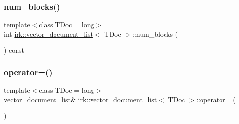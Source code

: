 \subsubsection{\texorpdfstring{num\+\_\+blocks()}{num\_blocks()}}
{\footnotesize\ttfamily template$<$class T\+Doc  = long$>$ \\
int \mbox{\hyperlink{classirk_1_1vector__document__list}{irk\+::vector\+\_\+document\+\_\+list}}$<$ T\+Doc $>$\+::num\+\_\+blocks (\begin{DoxyParamCaption}{ }\end{DoxyParamCaption}) const\hspace{0.3cm}{\ttfamily [inline]}}

\mbox{\label{classirk_1_1vector__document__list_a5e609af5fd334a30b4d66b78d4972ecb}} 
\subsubsection{\texorpdfstring{operator=()}{operator=()}\hspace{0.1cm}{\footnotesize\ttfamily [1/2]}}
{\footnotesize\ttfamily template$<$class T\+Doc  = long$>$ \\
\mbox{\hyperlink{classirk_1_1vector__document__list}{vector\+\_\+document\+\_\+list}}\& \mbox{\hyperlink{classirk_1_1vector__document__list}{irk\+::vector\+\_\+document\+\_\+list}}$<$ T\+Doc $>$\+::operator= (\begin{DoxyParamCaption}\item[{const \mbox{\hyperlink{classirk_1_1vector__document__list}{vector\+\_\+document\+\_\+list}}$<$ T\+Doc $>$ \&}]{ }\end{DoxyParamCaption})\hspace{0.3cm}{\ttfamily [default]}}

\mbox{\label{classirk_1_1vector__document__list_ace71e19d37f8c9d179b8e922893381d8}} 
